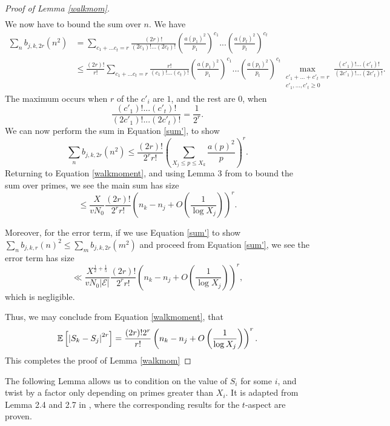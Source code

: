 \documentclass[12pt]{amsart}
\def\E{\ensuremath\mathbb{E}}
\numberwithin{equation}{section}
\numberwithin{thm}{section}
\newcommand{\1}{\mathbf 1}
\begin{document}
\begin{proof}[Proof of Lemma \ref{walkmom}]
\begin{align}
	\end{align}
	We now have to bound the sum over $n$. We have \begin{align}
		\sum_{n}b_{j,k,2r}(n^2)&=\sum_{c_1+...c_t=r} \frac{(2r)!}{(2c_1)!...(2c_t)!}\left(\frac{a(p_1)^2}{p_1}\right)^{c_1}...\left(\frac{a(p_t)^2}{p_t}\right)^{c_t}\nonumber\\
		&\le \label{sum'} \frac{(2r)!}{r!}\sum_{c_1+...c_t=r}\frac{r!}{(c_1)!...(c_t)!}\left(\frac{a(p_1)^2}{p_1}\right)^{c_1}...\left(\frac{a(p_t)^2}{p_t}\right)^{c_t} \max_{\substack{c'_1+...+c'_t=r\\ c'_1,...,c'_t\ge 0}} \frac{(c'_1)!...(c'_t)!}{(2c'_1)!...(2c'_t)!}.
	\end{align}
	The maximum occurs when $r$ of the $c'_i$ are $1$, and the rest are $0$, when \begin{equation}
		\frac{(c'_1)!...(c'_t)!}{(2c'_1)!...(2c'_t)!}=\frac{1}{2^r}.
	\end{equation}  
	We can now perform the sum in Equation \eqref{sum'}, to show
	\begin{equation}
		\sum_{n}b_{j,k,2r}(n^2)\le \frac{(2r)!}{2^rr!}\left(\sum_{X_j\le p\le X_k}\frac{a(p)^2}{p}\right)^r.
	\end{equation}	
	Returning to Equation \eqref{walkmoment}, and using Lemma 3 from \cite{AB24} to bound the sum over primes, we see the main sum has size \begin{equation}
		\le \frac{X}{vN_0} \frac{(2r)!}{2^rr!}\left(n_k-n_{j}+O\left(\frac{1}{\log X_j}\right)\right)^r. 
	\end{equation}
	
	Moreover, for the error term, if we use Equation \eqref{sum'} to show $\sum_n b_{j,k,r}(n)^2\le \sum_m b_{j,k,2r}(m\nonumber^2)$ and proceed from Equation \eqref{sum'}, we see the error term has size \begin{equation}
		\ll \frac{X^{\frac{1}{
					2}+\frac{1}{5}}}{vN_0|\mathcal{E}|} \frac{(2r)!}{2^rr!}\left(n_k-n_{j}+O\left(\frac{1}{\log X_j}\right)\right)^r, 
	\end{equation} 
	which is negligible.
	
	Thus, we may conclude from Equation \eqref{walkmoment}, that
	\begin{equation}
		\E\left[\left|S_{k}-S_{j}\right|^{2r}\right]= \frac{(2r)!2^r}{r!}\left(n_k-n_{j}+O\left(\frac{1}{\log X_j}\right)\right)^r. 
	\end{equation}
	This completes the proof of Lemma \ref{walkmom}
\end{proof} 
The following Lemma allows us to condition on the value of $S_{i}$ for some $i$, and twist by a factor only depending on primes greater than $X_i$. It is adapted from Lemma 2.4 and 2.7 in \cite{AB}, where the corresponding results for the $t$-aspect are proven.
\end{document}
